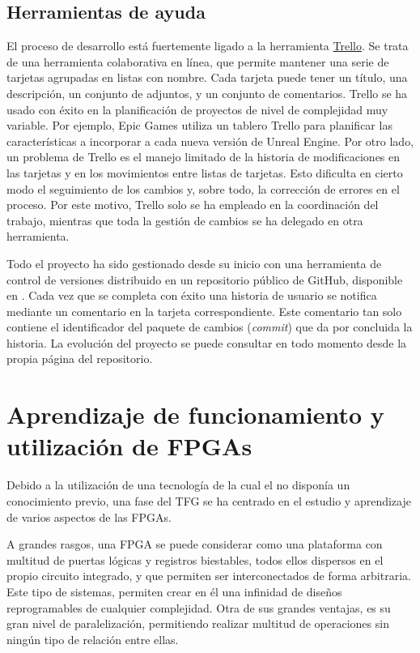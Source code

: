 \subsection{Herramientas de ayuda}
El proceso de desarrollo está fuertemente ligado a la herramienta \href{https://trello.com/}{Trello}. Se trata de una herramienta colaborativa en línea, que permite mantener una serie de tarjetas agrupadas en listas con nombre. Cada tarjeta puede tener un título, una descripción, un conjunto de adjuntos, y un conjunto de comentarios. Trello se ha usado con éxito en la planificación de proyectos de nivel de complejidad muy variable. Por ejemplo, Epic Games utiliza un tablero Trello para planificar las características a incorporar a cada nueva versión de Unreal Engine. Por otro lado, un problema de Trello es el manejo limitado de la historia de modificaciones en las tarjetas y en los movimientos entre listas de tarjetas. Esto dificulta en cierto modo el seguimiento de los cambios y, sobre todo, la corrección de errores en el proceso. Por este motivo, Trello solo se ha empleado en la coordinación del trabajo, mientras que toda la gestión de cambios se ha delegado en otra herramienta.

Todo el proyecto ha sido gestionado desde su inicio con una herramienta de control de versiones distribuido\cite{scottchaconbenstraub2018} en un repositorio público de GitHub, disponible en \thegitrepo. Cada vez que se completa con éxito una historia de usuario se notifica mediante un comentario en la tarjeta correspondiente. Este comentario tan solo contiene el identificador del paquete de cambios (\emph{commit}) que da por concluida la historia. La evolución del proyecto se puede consultar  en todo momento desde la propia página del repositorio.


\section{Aprendizaje de funcionamiento y utilización de FPGAs}
Debido a la utilización de una tecnología de la cual el no disponía un conocimiento previo, una fase del TFG se ha centrado en el estudio y aprendizaje de varios aspectos de las FPGAs.

A grandes rasgos, una FPGA\cite{kuon2008fpga} se puede considerar como una plataforma con multitud de puertas lógicas y registros biestables, todos ellos dispersos en el propio circuito integrado, y que permiten ser interconectados de forma arbitraria. Este tipo de sistemas, permiten crear en él una infinidad de diseños reprogramables de cualquier complejidad. Otra de sus grandes ventajas, es su gran nivel de paralelización, permitiendo realizar multitud de operaciones sin ningún tipo de relación entre ellas.

